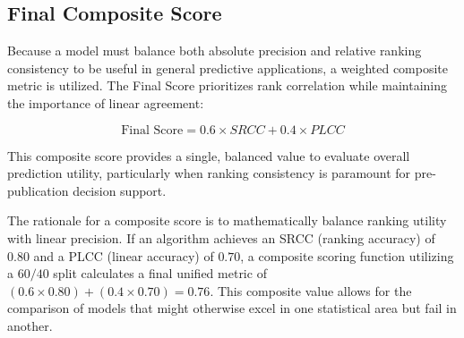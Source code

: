 \subsection{Final Composite Score}
Because a model must balance both absolute precision and relative ranking consistency to be useful in general predictive applications, a weighted composite metric is utilized. The Final Score prioritizes rank correlation while maintaining the importance of linear agreement:

$$\text{Final Score} = 0.6 \times SRCC + 0.4 \times PLCC$$

This composite score provides a single, balanced value to evaluate overall prediction utility, particularly when ranking consistency is paramount for pre-publication decision support.

The rationale for a composite score is to mathematically balance ranking utility with linear precision. If an algorithm achieves an SRCC (ranking accuracy) of $0.80$ and a PLCC (linear accuracy) of $0.70$, a composite scoring function utilizing a $60/40$ split calculates a final unified metric of $(0.6 \times 0.80) + (0.4 \times 0.70) = 0.76$. This composite value allows for the comparison of models that might otherwise excel in one statistical area but fail in another.

